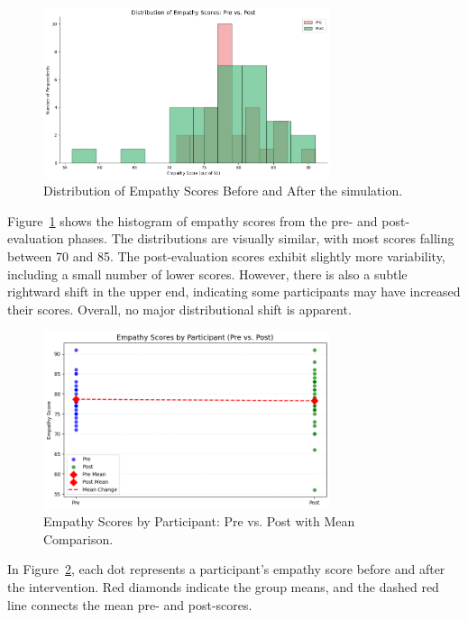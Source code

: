 \begin{figure}[htbp]
    \centering
    \includegraphics[width=0.75\textwidth]{../../Figures/emp-comparison.png}
    \caption{Distribution of Empathy Scores Before and After the simulation.}
    \label{fig:empathy_dist_hist}
\end{figure}

Figure~\ref{fig:empathy_dist_hist} shows the histogram of empathy scores from the pre- and post-evaluation phases. The distributions are visually similar, with most scores falling between 70 and 85. The post-evaluation scores exhibit slightly more variability, including a small number of lower scores. However, there is also a subtle rightward shift in the upper end, indicating some participants may have increased their scores. Overall, no major distributional shift is apparent.

\begin{figure}[htbp]
    \centering
    \includegraphics[width=0.75\textwidth]{../../Figures/emph-comparison-means.png}
    \caption{Empathy Scores by Participant: Pre vs. Post with Mean Comparison.}
    \label{fig:empathy_means_line}
\end{figure}

\vspace{1em}

In Figure~\ref{fig:empathy_means_line}, each dot represents a participant’s empathy score before and after the intervention. Red diamonds indicate the group means, and the dashed red line connects the mean pre- and post-scores.

